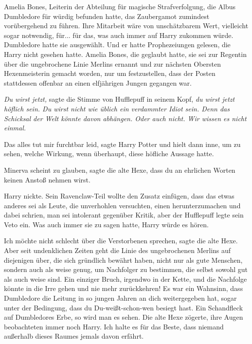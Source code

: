 Amelia Bones, Leiterin der Abteilung für magische Strafverfolgung, die Albus
Dumbledore für würdig befunden hatte, das Zaubergamot zumindest vorübergehend zu
führen. Ihre Mitarbeit wäre von unschätzbarem Wert, vielleicht sogar notwendig,
für... für das, was auch immer auf Harry zukommen würde. Dumbledore hatte sie
ausgewählt. Und er hatte Prophezeiungen gelesen, die Harry nicht gesehen hatte.
Amelia Bones, die geglaubt hatte, sie sei zur Regentin über die ungebrochene
Linie Merlins ernannt und zur nächsten Obersten Hexenmeisterin gemacht worden,
nur um festzustellen, dass der Posten stattdessen offenbar an einen elfjährigen
Jungen gegangen war.

\emph{Du wirst jetzt,} sagte die Stimme von Hufflepuff in seinem Kopf,\emph{ du
wirst jetzt höflich sein. Du wirst nicht wie üblich ein verdammter Idiot sein.
Denn das Schicksal der Welt könnte davon abhängen. Oder auch nicht. Wir wissen
es nicht einmal.}

\glqq{}Das alles tut mir furchtbar leid\grqq{}, sagte Harry Potter und hielt dann
inne, um zu sehen, welche Wirkung, wenn überhaupt, diese höfliche Aussage hatte.

\glqq{}Minerva scheint zu glauben\grqq{}, sagte die alte Hexe, \glqq{}dass du an
ehrlichen Worten keinen Anstoß nehmen wirst.\grqq{}

Harry nickte. Sein Ravenclaw-Teil wollte den Zusatz einfügen, dass das etwas
anderes sei als Leute, die unverhohlen versuchten, einen herunterzumachen und
dabei schrien, man sei intolerant gegenüber Kritik, aber der Hufflepuff legte
sein Veto ein. Was auch immer sie zu sagen hatte, Harry würde es hören.

\glqq{}Ich möchte nicht schlecht über die Verstorbenen sprechen\grqq{}, sagte die
alte Hexe. \glqq{}Aber seit undenklichen Zeiten geht die Linie des ungebrochenen
Merlins auf diejenigen über, die sich gründlich bewährt haben, nicht nur als
gute Menschen, sondern auch als weise genug, um Nachfolger zu bestimmen, die
selbst sowohl gut als auch weise sind. Ein einziger Bruch, irgendwo in der
Kette, und die Nachfolge könnte in die Irre gehen und nie mehr zurückkehren! Es
war ein Wahnsinn, dass Dumbledore die Leitung in so jungen Jahren an dich
weitergegeben hat, sogar unter der Bedingung, dass du Du-weißt-schon-wen besiegt
hast. Ein Schandfleck auf Dumbledores Erbe, so wird man es sehen.\grqq{} Die alte Hexe
zögerte, ihre Augen beobachteten immer noch Harry. \glqq{}Ich halte es für das
Beste, dass niemand außerhalb dieses Raumes jemals davon erfährt.\grqq{}

